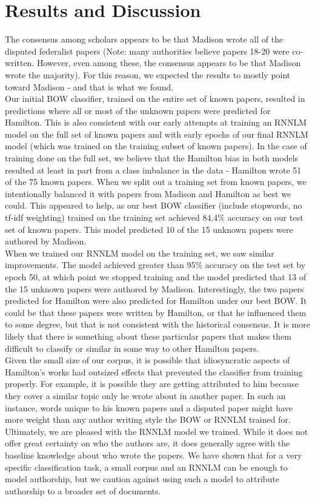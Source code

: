 \documentclass[11pt]{article}
\begin{document}
\section{Results and Discussion}
The consensus among scholars appears to be that Madison wrote all of the disputed federalist papers (Note: many authorities believe papers 18-20 were co-written. However, even among these, the consensus appears to be that Madison wrote the majority). For this reason, we expected the results to mostly point toward Madison - and that is what we found.\\
Our initial BOW classifier, trained on the entire set of known papers, resulted in predictions where all or most of the unknown papers were predicted for Hamilton. This is also consistent with our early attempts at training an RNNLM model on the full set of known papers and with early epochs of our final RNNLM model (which was trained on the training subset of known papers). In the case of training done on the full set, we believe that the Hamilton bias in both models resulted at least in part from a class imbalance in the data - Hamilton wrote 51 of the 75 known papers. When we split out a training set from known papers, we intentionally balanced it with papers from Madison and Hamilton as best we could. This appeared to help, as our best BOW classifier (include stopwords, no tf-idf weighting) trained on the training set achieved 84.4\% accuracy on our test set of known papers. This model predicted 10 of the 15 unknown papers were authored by Madison.\\
When we trained our RNNLM model on the training set, we saw similar improvements. The model achieved greater than 95\% accuracy on the test set by epoch 50, at which point we stopped training and the model predicted that 13 of the 15 unknown papers were authored by Madison. Interestingly, the two papers predicted for Hamilton were also predicted for Hamilton under our best BOW. It could be that these papers were written by Hamilton, or that he influenced them to some degree, but that is not consistent with the historical consensus. It is more likely that there is something about these particular papers that makes them difficult to classify or similar in some way to other Hamilton papers.\\
Given the small size of our corpus, it is possible that idiosyncratic aspects of Hamilton's works had outsized effects that prevented the classifier from training properly. For example, it is possible they are getting attributed to him because they cover a similar topic only he wrote about in another paper. In such an instance, words unique to his known papers and a disputed paper might have more weight than any author writing style the BOW or RNNLM trained for.\\
Ultimately, we are pleased with the RNNLM model we trained. While it does not offer great certainty on who the authors are, it does generally agree with the baseline knowledge about who wrote the papers. We have shown that for a very specific classification task, a small corpus and an RNNLM can be enough to model authorship, but we caution against using such a model to attribute authorship to a broader set of documents.
\end{document}
